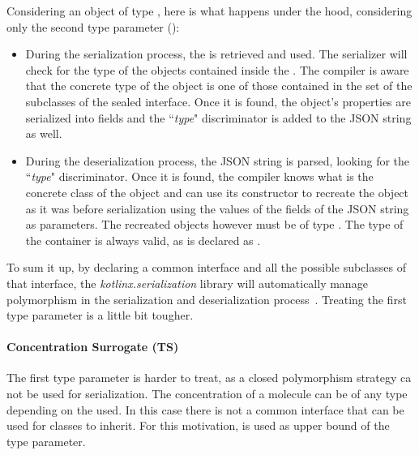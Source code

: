 


Considering an object of type , here is what happens under the hood, considering only the second type parameter ():
\begin{itemize}
	\item During the serialization process, the   is retrieved and used. The serializer will check for the type of the  objects contained inside the . The compiler is aware that the concrete type of the object is one of those contained in the set of the subclasses of the sealed interface. Once it is found, the object's properties are serialized into fields and the ``\textit{type}" discriminator is added to the JSON string as well.
	\item  During the deserialization process, the JSON string is parsed, looking for the ``\textit{type}" discriminator. Once it is found, the compiler knows what is the concrete class of the object and can use its constructor to recreate the object as it was before serialization using the values of the fields of the JSON string as parameters. The recreated objects however must be of type . The type of the container is always valid, as  is declared as .
\end{itemize}

To sum it up, by declaring  a common interface and  all the possible subclasses of that interface, the \textit{kotlinx.serialization} library will automatically manage polymorphism in the serialization and deserialization process~\cite{kotlinxs9:online}. Treating the first type parameter is a little bit tougher.

\paragraph{Concentration Surrogate (TS)} The first type parameter is harder to treat, as a closed polymorphism strategy ca not be used for serialization. The concentration of a molecule can be of any type depending on the  used. In this case there is not a common interface that can be used for classes to inherit. For this motivation,  is used as upper bound of the  type parameter.\newline

